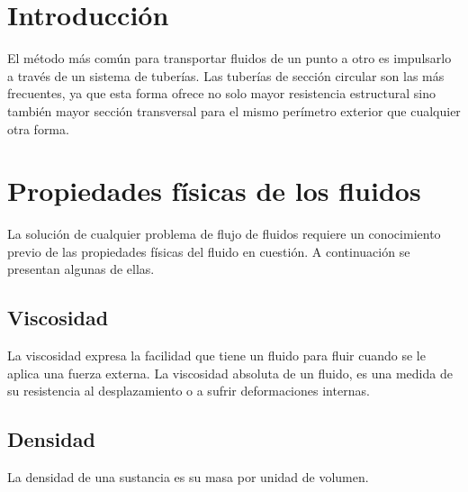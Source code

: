 \documentclass[11pt,letterpaper]{article}
\begin{document}
	\section{Introducción}
	
	El método más común para transportar fluidos de un punto a otro es impulsarlo a través de un sistema de tuberías. Las tuberías de sección circular son las más frecuentes, ya que esta forma ofrece no solo mayor resistencia estructural sino también mayor sección transversal para el mismo perímetro exterior que cualquier otra forma. \parencite{crane}
	
	\section{Propiedades físicas de los fluidos}
	
	La solución de cualquier problema de flujo de fluidos requiere un conocimiento previo de las propiedades físicas del fluido en cuestión. A continuación se presentan algunas de ellas.
	
	\subsection{Viscosidad}
	
	La viscosidad expresa la facilidad que tiene un fluido para fluir cuando se le aplica una fuerza externa. La viscosidad absoluta de un fluido, es una medida de su resistencia al desplazamiento o  a sufrir deformaciones internas.
	
	\subsection{Densidad}
	
	La densidad de una sustancia es su masa por unidad de volumen.
	
	\printbibliography[title={Referencias}]
	
\end{document}

